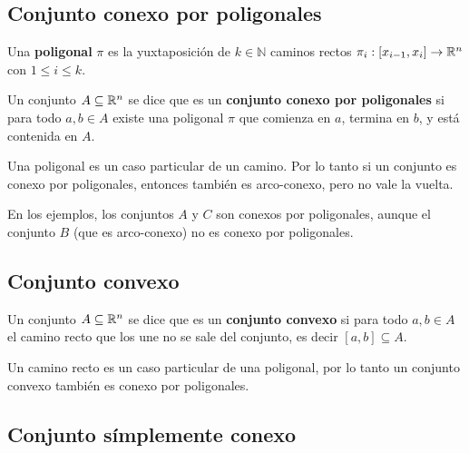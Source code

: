 \subsection{Conjunto conexo por poligonales}

\begin{definition}[Poligonal]
Una \textbf{poligonal} $\pi$ es la yuxtaposición de $k \in \mathbb{N}$ caminos rectos $\pi_i : [x_{i-1}, x_i] \to \mathbb{R}^n$ con $1 \leq i \leq k$. 
\end{definition}

\begin{definition}
Un conjunto $A \subseteq \mathbb{R}^n$ se dice que es un \textbf{conjunto conexo por poligonales} si para todo $a, b \in A$ existe una poligonal $\pi$ que comienza en $a$, termina en $b$, y está contenida en $A$.
\end{definition}

\begin{observation}
Una poligonal es un caso particular de un camino.  Por lo tanto si un conjunto es conexo por poligonales, entonces también es arco-conexo, pero no vale la vuelta.
\end{observation}

\begin{example}
En los ejemplos, los conjuntos $A$ y $C$ son conexos por poligonales, aunque el conjunto $B$ (que es arco-conexo) no es conexo por poligonales.
\end{example}

\subsection{Conjunto convexo}

\begin{definition}[Convexo]
Un conjunto $A \subseteq \mathbb{R}^n$ se dice que es un \textbf{conjunto convexo}  si para todo $a, b \in A$ el camino recto que los une no se sale del conjunto, es decir $[a,b] \subseteq A$.
\end{definition}

\begin{observation}
Un camino recto es un caso particular de una poligonal, por lo tanto un conjunto convexo también es conexo por poligonales.
\end{observation}

\subsection{Conjunto símplemente conexo}

